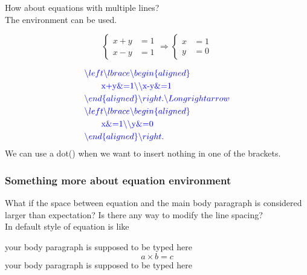 \begin{frame}
	How about equations with multiple lines?\\
	The  environment can be used.
	\begin{example}
		\begin{equation}
		\left\lbrace\begin{aligned}
			x+y&=1\\x-y&=1
		\end{aligned}\right.\Longrightarrow
		\left\lbrace\begin{aligned}
			x&=1\\y&=0
		\end{aligned}\right.
		\end{equation}
	\end{example}
	\begin{align*}
		&\color{blue} \backslash left \backslash lbrace \backslash begin\{aligned\}\\
		&\color{blue} \quad\quad\text{x+y\&=1} \backslash \backslash \text{x-y\&=1}\\
		&\color{blue} \backslash end\{aligned\}\backslash right.\backslash Longrightarrow\\
		&\color{blue} \backslash left \backslash lbrace \backslash begin\{aligned\}\\
		&\color{blue} \quad\quad\text{x\&=1} \backslash \backslash \text{y\&=0}\\
		&\color{blue} \backslash end\{aligned\}\backslash right.
	\end{align*}
	We can use a dot() when we want to insert nothing in one of the brackets.
\end{frame}

\begin{frame}
	\frametitle{Something more about equation environment}
    What if the space between equation and the main body paragraph is considered larger than expectation? Is there any way to modify the line spacing?
\\In default style of equation is like
    \begin{example}
    your body paragraph is supposed to be typed here
        \begin{equation}
         a \times b =c
        \end{equation}
    your body paragraph is supposed to be typed here
	\end{example}
\end{frame}

